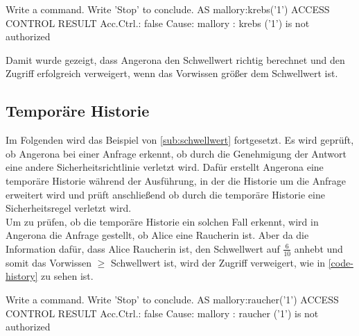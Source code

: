 \documentclass[german,version-2020-11]{uzl-thesis}
\begin{document}
\begin{Pseudocode}[caption={Angerona Ergebnis für Schwellwert=$\frac{34}{80}$}, label={code-thresholdNoAccess}]
Write a command. Write 'Stop' to conclude.
AS mallory:krebs('1')
ACCESS CONTROL RESULT
	Acc.Ctrl.: false Cause: mallory : krebs ('1') is not authorized
\end{Pseudocode}

Damit wurde gezeigt, dass Angerona den Schwellwert richtig berechnet und den Zugriff erfolgreich verweigert, wenn das Vorwissen größer dem Schwellwert ist.

\subsection{Temporäre Historie}
Im Folgenden wird das Beispiel von \cref{sub:schwellwert} fortgesetzt. Es wird geprüft, ob Angerona bei einer Anfrage erkennt, ob durch die Genehmigung der Antwort eine andere Sicherheitsrichtlinie verletzt wird. Dafür erstellt Angerona eine temporäre Historie während der Ausführung, in der die Historie um die Anfrage erweitert wird und prüft anschließend ob durch die temporäre Historie eine Sicherheitsregel verletzt wird. \\ 
Um zu prüfen, ob die temporäre Historie ein solchen Fall erkennt, wird in Angerona die Anfrage gestellt, ob Alice eine Raucherin ist. Aber da die Information dafür, dass Alice Raucherin ist, den Schwellwert auf $\frac{6}{10}$ anhebt und somit das Vorwissen $\geq$ Schwellwert ist, wird der Zugriff verweigert, wie in \autoref{code-history} zu sehen ist. 

\begin{Pseudocode}[caption={Angerona Ergebnis für die Abfrage, ob Alice Raucherin ist}, label={code-history}]
Write a command. Write 'Stop' to conclude.
AS mallory:raucher('1')
ACCESS CONTROL RESULT
	Acc.Ctrl.: false Cause: mallory : raucher ('1') is not authorized
\end{Pseudocode}
\end{document}
